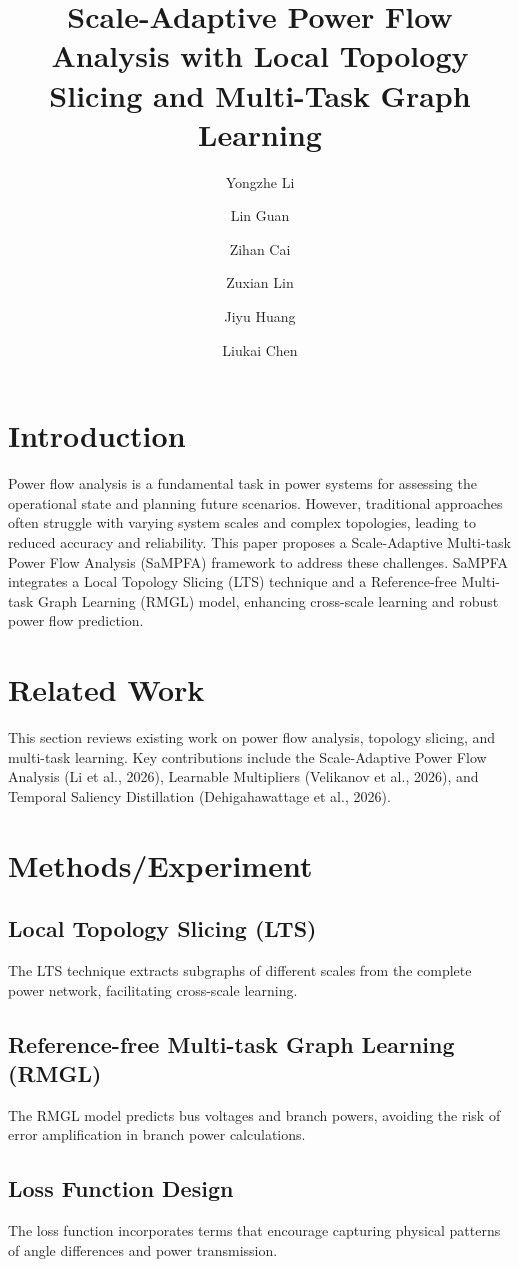 \documentclass{article}
\title{Scale-Adaptive Power Flow Analysis with Local Topology Slicing and Multi-Task Graph Learning}
\author{Yongzhe Li \and Lin Guan \and Zihan Cai \and Zuxian Lin \and Jiyu Huang \and Liukai Chen}
\date{}
\begin{document}
\maketitle

\section{Introduction}
Power flow analysis is a fundamental task in power systems for assessing the operational state and planning future scenarios. However, traditional approaches often struggle with varying system scales and complex topologies, leading to reduced accuracy and reliability. This paper proposes a Scale-Adaptive Multi-task Power Flow Analysis (SaMPFA) framework to address these challenges. SaMPFA integrates a Local Topology Slicing (LTS) technique and a Reference-free Multi-task Graph Learning (RMGL) model, enhancing cross-scale learning and robust power flow prediction.

\section{Related Work}
This section reviews existing work on power flow analysis, topology slicing, and multi-task learning. Key contributions include the Scale-Adaptive Power Flow Analysis (Li et al., 2026), Learnable Multipliers (Velikanov et al., 2026), and Temporal Saliency Distillation (Dehigahawattage et al., 2026).

\section{Methods/Experiment}
\subsection{Local Topology Slicing (LTS)}
The LTS technique extracts subgraphs of different scales from the complete power network, facilitating cross-scale learning.

\subsection{Reference-free Multi-task Graph Learning (RMGL)}
The RMGL model predicts bus voltages and branch powers, avoiding the risk of error amplification in branch power calculations.

\subsection{Loss Function Design}
The loss function incorporates terms that encourage capturing physical patterns of angle differences and power transmission.
\end{document}
